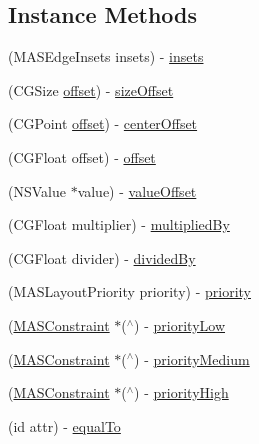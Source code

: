 \subsection*{Instance Methods}
\begin{DoxyCompactItemize}
\item 
(M\+A\+S\+Edge\+Insets insets) -\/ \mbox{\hyperlink{interface_m_a_s_constraint_a71f2a3447f5666b0c1111e9cc91ec134}{insets}}
\item 
(C\+G\+Size \mbox{\hyperlink{interface_m_a_s_constraint_a9fc79ce794fd6b4bf204fcd8e6d07345}{offset}}) -\/ \mbox{\hyperlink{interface_m_a_s_constraint_acc633dbb5dcca4fe450e66b45417ff71}{size\+Offset}}
\item 
(C\+G\+Point \mbox{\hyperlink{interface_m_a_s_constraint_a9fc79ce794fd6b4bf204fcd8e6d07345}{offset}}) -\/ \mbox{\hyperlink{interface_m_a_s_constraint_a8f353c8e713090e59282ef98dfc5c138}{center\+Offset}}
\item 
(C\+G\+Float offset) -\/ \mbox{\hyperlink{interface_m_a_s_constraint_a9fc79ce794fd6b4bf204fcd8e6d07345}{offset}}
\item 
(N\+S\+Value $\ast$value) -\/ \mbox{\hyperlink{interface_m_a_s_constraint_ab0ac0ed821e4b7ff3bda18c9be98776b}{value\+Offset}}
\item 
(C\+G\+Float multiplier) -\/ \mbox{\hyperlink{interface_m_a_s_constraint_a4893123b37d88a88685341b9b8b01cb9}{multiplied\+By}}
\item 
(C\+G\+Float divider) -\/ \mbox{\hyperlink{interface_m_a_s_constraint_ad70cd0330c4f81e55f3eb7d54c941612}{divided\+By}}
\item 
(M\+A\+S\+Layout\+Priority priority) -\/ \mbox{\hyperlink{interface_m_a_s_constraint_a5a43d321e7b289e10568b5c458f8e97d}{priority}}
\item 
(\mbox{\hyperlink{interface_m_a_s_constraint}{M\+A\+S\+Constraint}} $\ast$($^\wedge$) -\/ \mbox{\hyperlink{interface_m_a_s_constraint_a0da58cfaf6c9ae2ee86241a780170122}{priority\+Low}}
\item 
(\mbox{\hyperlink{interface_m_a_s_constraint}{M\+A\+S\+Constraint}} $\ast$($^\wedge$) -\/ \mbox{\hyperlink{interface_m_a_s_constraint_a062d888bf6be5751893ac1e5f14ba655}{priority\+Medium}}
\item 
(\mbox{\hyperlink{interface_m_a_s_constraint}{M\+A\+S\+Constraint}} $\ast$($^\wedge$) -\/ \mbox{\hyperlink{interface_m_a_s_constraint_a1f9bd3756b95b21a3bda2f71b8ba7639}{priority\+High}}
\item 
(id attr) -\/ \mbox{\hyperlink{interface_m_a_s_constraint_a116e3369c6e54160d3de01c3fef68897}{equal\+To}}

\end{DoxyCompactItemize}
